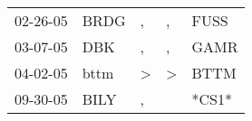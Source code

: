 \begin{supertabular}{lllll}
 02-26-05 &  BRDG &             , &             , &   FUSS \\
 03-07-05 &   DBK &             , &             , &   GAMR \\
 04-02-05 &  bttm &  \textgreater &  \textgreater &   BTTM \\
 09-30-05 &  BILY &             , &               &  *CS1* \\
\end{supertabular}

